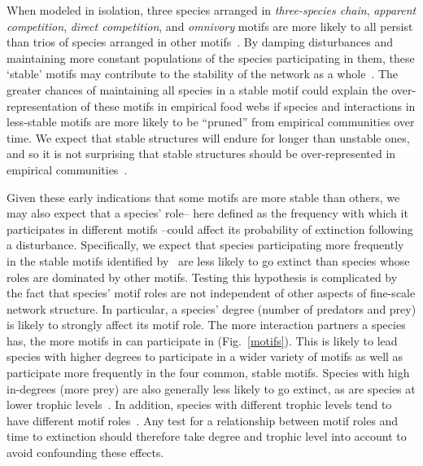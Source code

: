 \documentclass[12pt]{article}
\begin{document}
\begin{spacing}{2.0}
	When modeled in isolation, three species arranged in \emph{three-species chain}, \emph{apparent competition}, \emph{direct competition}, and \emph{omnivory} motifs are more likely to all persist than trios of species arranged in other motifs~\citep{Borrelli2015a}.
	By damping disturbances and maintaining more constant populations of the species participating in them, these `stable' motifs may contribute to the stability of the network as a whole~\citep{Borrelli2015a}. 
    The greater chances of maintaining all species in a stable motif could explain the over-representation of these motifs in empirical food webs if species and interactions in less-stable motifs are more likely to be ``pruned'' from empirical communities over time. We expect that stable structures will endure for longer than unstable ones, and so it is not surprising that stable structures should be over-represented in empirical communities~\citep{Borrelli2015}.


	Given these early indications that some motifs are more stable than others, we may also expect that a species' role-- here defined as the frequency with which it participates in different motifs --could affect its probability of extinction following a disturbance.
	Specifically, we expect that species participating more frequently in the stable motifs identified by~\citet{Borrelli2015a} are less likely to go extinct than species whose roles are dominated by other motifs.
	Testing this hypothesis is complicated by the fact that species' motif roles are not independent of other aspects of fine-scale network structure. 
    In particular, a species' degree (number of predators and prey) is likely to strongly affect its motif role.
    The more interaction partners a species has, the more motifs in can participate in (Fig.~\ref{motifs}).
    This is likely to lead species with higher degrees to participate in a wider variety of motifs as well as participate more frequently in the four common, stable motifs.
    Species with high in-degrees (more prey) are also generally less likely to go extinct, as are species at lower trophic levels~\citep{Cirtwill2018FoodWebs}.
    In addition, species with different trophic levels tend to have different motif roles~\citep{Cirtwill2018EcolLett}.
    Any test for a relationship between motif roles and time to extinction should therefore take degree and trophic level into account to avoid confounding these effects.  
    

\end{spacing}
\end{document}
